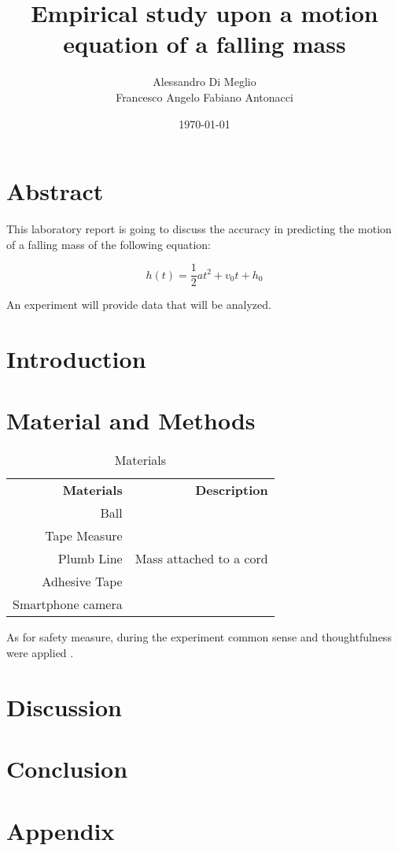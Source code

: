\documentclass[11pt]{article}
\title{Empirical study upon a motion equation of a falling mass}
\author{Alessandro Di Meglio\\Francesco Angelo Fabiano Antonacci}
\date{\today}
\begin{document}
\maketitle

\section{Abstract}
This laboratory report is going to discuss the accuracy in predicting the motion of a falling mass of the following equation:

\begin{equation}
h(t)=\frac{1}{2} a t^2+v_0 t+h_0
\end{equation}

An experiment will provide data that will be analyzed.

\section{Introduction}

\section{Material and Methods}

\begin{table}[h!]
  \begin{center}
    \caption{Materials}
    \label{tab:Tabel of materials}
    \begin{tabular}{r|r} %
      \textbf{Materials} & \textbf{Description} \\

	Ball \\
	Tape Measure\\
	Plumb Line& Mass attached to a cord\\
	Adhesive Tape\\
	Smartphone camera\\
    \end{tabular}
  \end{center}
\end{table}



As for safety measure, during the experiment common sense and thoughtfulness were applied  .

\section{Discussion}

\section{Conclusion}
\section{Appendix}
\end{document}
